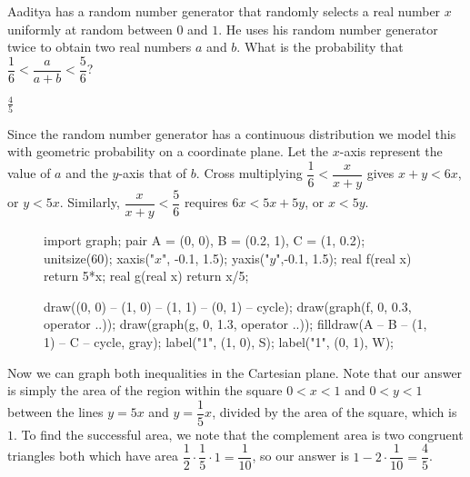 \documentclass[11pt]{article}
\begin{document}
\begin{problem}
Aaditya has a random number generator that randomly selects a real number $x$ uniformly at random between $0$ and $1$. He uses his random number generator twice to obtain two real numbers $a$ and $b$. What is the probability that $\dfrac{1}{6} < \dfrac{a}{a+b} < \dfrac{5}{6}$?
\end{problem}

\begin{answer}
$\boxed{\frac{4}{5}}$
\end{answer}

\begin{solution}
Since the random number generator has a continuous distribution we model this with geometric probability on a coordinate plane. Let the $x$-axis represent the value of $a$ and the $y$-axis that of $b$. Cross multiplying $\dfrac{1}{6} < \dfrac{x}{x+y}$ gives $x+y < 6x$, or $y < 5x$. Similarly, $\dfrac{x}{x+y} < \dfrac{5}{6}$ requires $6x < 5x+5y$, or $x < 5y$.

\begin{figure}[H]
	\begin{center}
		\begin{asy}
		import graph;
		pair A = (0, 0), B = (0.2, 1), C = (1, 0.2);
		unitsize(60);
		xaxis("$x$", -0.1, 1.5);
		yaxis("$y$",-0.1, 1.5);
		real f(real x) {return 5*x;}
		real g(real x) {return x/5;}

		draw((0, 0) -- (1, 0) -- (1, 1) -- (0, 1) -- cycle);
		draw(graph(f, 0, 0.3, operator ..));
		draw(graph(g, 0, 1.3, operator ..));
		filldraw(A -- B -- (1, 1) -- C -- cycle, gray);
		label("1", (1, 0), S);
		label("1", (0, 1), W);
		\end{asy}
	\end{center}
\end{figure}

Now we can graph both inequalities in the Cartesian plane. Note that our answer is simply the area of the region within the square $0 < x < 1$ and $0 < y < 1$ between the lines $y=5x$ and $y = \dfrac{1}{5}x$, divided by the area of the square, which is $1$. To find the successful area, we note that the complement area is two congruent triangles both which have area $\dfrac{1}{2} \cdot \dfrac{1}{5} \cdot 1  = \dfrac{1}{10}$, so our answer is $1 - 2 \cdot \dfrac{1}{10} = \boxed{\dfrac{4}{5}}$.
\end{solution}
\end{document}
